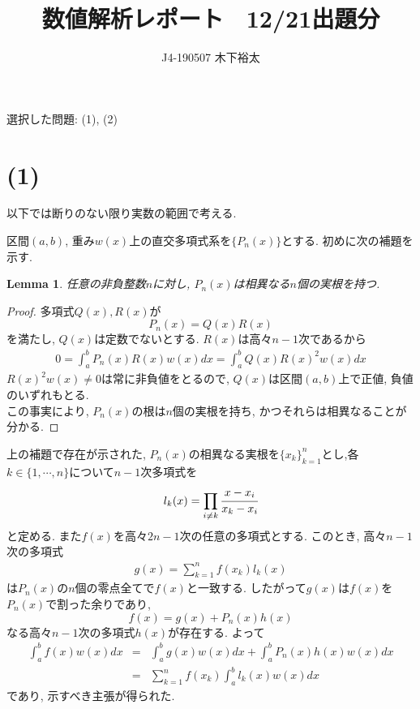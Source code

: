 \documentclass[uplatex,dvipdfmx]{jsarticle}
\title{数値解析レポート　12/21出題分}
\author{J4-190507 木下裕太}
\newtheorem{lemma}{Lemma}
\begin{document}
  \maketitle

  選択した問題: (1), (2)

  \section*{(1)}
  以下では断りのない限り実数の範囲で考える.

区間$(a,b)$, 重み$w(x)$上の直交多項式系を$\{P_n(x)\}$とする.
初めに次の補題を示す.

\begin{lemma}
  任意の非負整数$n$に対し, $P_n(x)$は相異なる$n$個の実根を持つ.
\end{lemma}

\begin{proof}
  多項式$Q(x),R(x)$が
  \begin{equation*}
    P_n(x)=Q(x)R(x)
  \end{equation*}
  を満たし, $Q(x)$は定数でないとする. $R(x)$は高々$n-1$次であるから
  \begin{eqnarray*}
    0=\int_a^b P_n(x)R(x) w(x)dx=\int_a^b Q(x)R(x)^2 w(x)dx
  \end{eqnarray*}
  $R(x)^2w(x)\neq 0$は常に非負値をとるので, $Q(x)$は区間$(a,b)$上で正値, 負値のいずれもとる.\\
  この事実により, $P_n(x)$の根は$n$個の実根を持ち, かつそれらは相異なることが分かる.

\end{proof}

上の補題で存在が示された, $P_n(x)$の相異なる実根を$\{x_k\}_{k=1}^n$とし,各$k\in\{1,\cdots, n\}$について$n-1$次多項式を
\begin{eqnarray*}
  l_k(x)=\prod_{i\neq k} \cfrac{x-x_i}{x_k-x_i}
\end{eqnarray*}
と定める.
また$f(x)$を高々$2n-1$次の任意の多項式とする.
このとき, 高々$n-1$次の多項式
\begin{eqnarray*}
  g(x)=\sum_{k=1}^n f(x_k)l_k(x)
\end{eqnarray*}
は$P_n(x)$の$n$個の零点全てで$f(x)$と一致する.
したがって$g(x)$は$f(x)$を$P_n(x)$で割った余りであり,
\begin{equation*}
f(x)=g(x)+P_n(x)h(x)
\end{equation*}
なる高々$n-1$次の多項式$h(x)$が存在する. よって
\begin{eqnarray*}
  \int_a^b f(x)w(x)dx &=& \int_a^b g(x)w(x)dx + \int_a^b P_n(x)h(x) w(x)dx\\
  &=& \sum_{k=1}^n f(x_k)\int_a^b l_k(x)w(x)dx
\end{eqnarray*}
であり, 示すべき主張が得られた.
\end{document}
